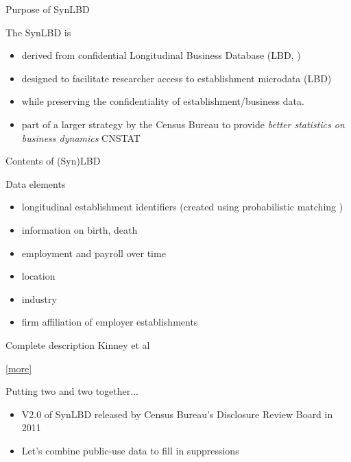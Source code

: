 \begin{frame}{Purpose of SynLBD}
\begin{block}{The SynLBD is }
\begin{itemize}[<+->]
\item derived from confidential Longitudinal Business Database (LBD, \cite{MirandaJarmin2002})
\item designed to facilitate researcher access to establishment microdata (LBD)
\item while preserving the confidentiality of establishment/business data. 
\item part of a larger strategy by the Census Bureau to provide \textit{better 
statistics on business dynamics} CNSTAT  \cite{CNSTATBusinessDynamics}
\end{itemize}
\end{block}
\end{frame}


\begin{frame}{Contents of (Syn)LBD}
\begin{block}{Data elements}
\begin{itemize}
\item  longitudinal establishment identifiers (created using probabilistic matching \cite{MirandaJarmin2002}) 
\item information on birth, death 
\item  employment and payroll over time 
\item location 
\item industry 
\item firm  affiliation of  employer establishments 
\end{itemize}
\end{block}
\pause
\pause
\begin{block}{Complete description}
Kinney et al \cite{KinneyEtAl2011}
\end{block}
\tiny \hfill[\hyperref[sec:SynLBD_details]{more}]
\end{frame}

\begin{frame}
\begin{block}{Putting two and two together...}
\begin{itemize}[<+->]
\item[] 
V2.0 of SynLBD released by Census Bureau's Disclosure Review Board in 2011
\item[]
Let's combine public-use data to fill in suppressions

\end{itemize}
\end{block}
\end{frame}


